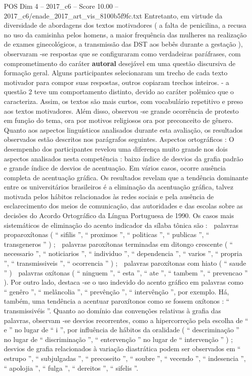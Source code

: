 \begin{textsample}{POS Dim 4 – 2017\_c6 – Score 10.00 – 2017\_c6/enade\_2017\_art\_vis\_8100b5f9fc.txt}
Entretanto, em virtude da diversidade de abordagens dos textos motivadores ( a falta de penicilina, a recusa no uso da camisinha pelos homens, a maior frequência das mulheres na realização de exames ginecológicos, a transmissão das DST aos bebês durante a gestação ), observaram -se respostas que se configuraram como verdadeiras paráfrases, com comprometimento do caráter \textbf{autoral} desejável em uma questão discursiva de formação geral.
Alguns participantes selecionaram um trecho de cada texto motivador para compor suas respostas, outros copiaram trechos inteiros. - a questão 2 teve um comportamento distinto, devido ao caráter polêmico que o caracteriza.
Assim, os textos são mais curtos, com vocabulário repetitivo e preso aos textos motivadores.
Além disso, observou -se grande ocorrência de protesto em função do tema, ora por motivos religiosos ora por preconceito de gênero.
Quanto aos aspectos linguísticos analisados durante esta avaliação, os resultados observados estão descritos nos parágrafos seguintes.
Aspectos ortográficos : O desempenho dos participantes revelou uma diferença muito grande nos dois aspectos analisados nesta competência : baixo índice de desvios da grafia padrão e grande índice de desvios de acentuação.
Em vários casos, ocorre ausência completa de acentuação gráfica.
Os resultados revelam que a tendência dominante entre os universitários brasileiros é a eliminação da acentuação gráfica, talvez motivada pelos hábitos relacionados às redes sociais e pela ausência de esclarecimento dos meios de comunicação, das autoridades e das escolas sobre as decisões do Acordo Ortográfico da Língua Portuguesa de 1990.
Os casos mais sistemáticos de eliminação do acento indicador da sílaba tônica são :  palavras proparoxítonas ( “ sifilis ”, “ proximos ”, “ politicas ”, “ publicas ”, “ transgeneros ” ) ;  palavras paroxítonas terminadas em ditongo crescente ( “ necessario ”, “ noticiarios ”, “ individuo ”, “ dependencia ”, “ varios ”, “ propria ”, “ transmissiveis ”, “ ocorrencia ” ) ;  palavras paroxítonas com hiato ( “ saude ” )  palavras oxítonas ( “ ninguem ”, “ esta ”, “ ate ”, “ tambem ”, “ prevencao ” ).
Por outro lado, destaca -se o uso indevido do acento gráfico em palavras como “ genêro ”, “ melâncolia ”, “ prevênção ”, “ intervênção ”, por exemplo.
Há, também, uma tendência a acentuar paroxítonos como se fossem oxítonos : “ transmissivéis ”.
Quanto ao domínio das convenções relativas à grafia das palavras, observam -se desvios recorrentes, como a hipercorreção pela escolha de “ e ” no lugar de “ i ”, por influência de hábitos da oralidade ( “ descriminação ” no lugar de “ discriminação ”, “ entervenção ” no lugar de “ intervenção ” ) ; desvios de grafia relacionados à variação diastrática podem ser observados em “ estrupo ”, “ subjulgadas ”, “ precoseito ”, “ soubre ”, “ vecendo ”, “ indesencia ”, “ apolojia ”, “ fulga ”, “ dereitos ”, “ sifelis ”.

\end{textsample}
